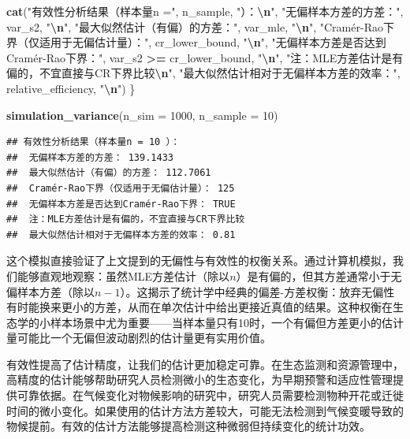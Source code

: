 \documentclass[
  twoside,12pt,fontset=none]{ctexbook}
\newenvironment{Shaded}{\begin{snugshade}}{\end{snugshade}}
\newcommand{\AttributeTok}[1]{\textcolor[rgb]{0.13,0.29,0.53}{#1}}
\newcommand{\DecValTok}[1]{\textcolor[rgb]{0.00,0.00,0.81}{#1}}
\newcommand{\FunctionTok}[1]{\textcolor[rgb]{0.13,0.29,0.53}{\textbf{#1}}}
\newcommand{\NormalTok}[1]{#1}
\newcommand{\SpecialCharTok}[1]{\textcolor[rgb]{0.81,0.36,0.00}{\textbf{#1}}}
\newcommand{\StringTok}[1]{\textcolor[rgb]{0.31,0.60,0.02}{#1}}
\begin{document}
\begin{Shaded}
\begin{Highlighting}[]
  \FunctionTok{cat}\NormalTok{(}\StringTok{"有效性分析结果（样本量n ="}\NormalTok{, n\_sample, }\StringTok{"）：}\SpecialCharTok{\textbackslash{}n}\StringTok{"}\NormalTok{,}
      \StringTok{"无偏样本方差的方差："}\NormalTok{, var\_s2, }\StringTok{"}\SpecialCharTok{\textbackslash{}n}\StringTok{"}\NormalTok{,}
      \StringTok{"最大似然估计（有偏）的方差："}\NormalTok{, var\_mle, }\StringTok{"}\SpecialCharTok{\textbackslash{}n}\StringTok{"}\NormalTok{,}
      \StringTok{"Cramér{-}Rao下界（仅适用于无偏估计量）："}\NormalTok{, cr\_lower\_bound, }\StringTok{"}\SpecialCharTok{\textbackslash{}n}\StringTok{"}\NormalTok{,}
      \StringTok{"无偏样本方差是否达到Cramér{-}Rao下界："}\NormalTok{, var\_s2 }\SpecialCharTok{\textgreater{}=}\NormalTok{ cr\_lower\_bound, }\StringTok{"}\SpecialCharTok{\textbackslash{}n}\StringTok{"}\NormalTok{,}
      \StringTok{"注：MLE方差估计是有偏的，不宜直接与CR下界比较}\SpecialCharTok{\textbackslash{}n}\StringTok{"}\NormalTok{,}
      \StringTok{"最大似然估计相对于无偏样本方差的效率："}\NormalTok{, relative\_efficiency, }\StringTok{"}\SpecialCharTok{\textbackslash{}n}\StringTok{"}\NormalTok{)}
\NormalTok{\}}

\FunctionTok{simulation\_variance}\NormalTok{(}\AttributeTok{n\_sim =} \DecValTok{1000}\NormalTok{, }\AttributeTok{n\_sample =} \DecValTok{10}\NormalTok{)}
\end{Highlighting}
\end{Shaded}

\begin{verbatim}
## 有效性分析结果（样本量n = 10 ）：
##  无偏样本方差的方差： 139.1433 
##  最大似然估计（有偏）的方差： 112.7061 
##  Cramér-Rao下界（仅适用于无偏估计量）： 125 
##  无偏样本方差是否达到Cramér-Rao下界： TRUE 
##  注：MLE方差估计是有偏的，不宜直接与CR下界比较
##  最大似然估计相对于无偏样本方差的效率： 0.81
\end{verbatim}

这个模拟直接验证了上文提到的无偏性与有效性的权衡关系。通过计算机模拟，我们能够直观地观察：虽然MLE方差估计（除以\(n\)）是有偏的，但其方差通常小于无偏样本方差（除以\(n-1\)）。这揭示了统计学中经典的偏差-方差权衡：放弃无偏性有时能换来更小的方差，从而在单次估计中给出更接近真值的结果。这种权衡在生态学的小样本场景中尤为重要------当样本量只有10时，一个有偏但方差更小的估计量可能比一个无偏但波动剧烈的估计量更有实用价值。

有效性提高了估计精度，让我们的估计更加稳定可靠。在生态监测和资源管理中，高精度的估计能够帮助研究人员检测微小的生态变化，为早期预警和适应性管理提供可靠依据。在气候变化对物候影响的研究中，研究人员需要检测物种开花或迁徙时间的微小变化。如果使用的估计方法方差较大，可能无法检测到气候变暖导致的物候提前。有效的估计方法能够提高检测这种微弱但持续变化的统计功效。
\end{document}
